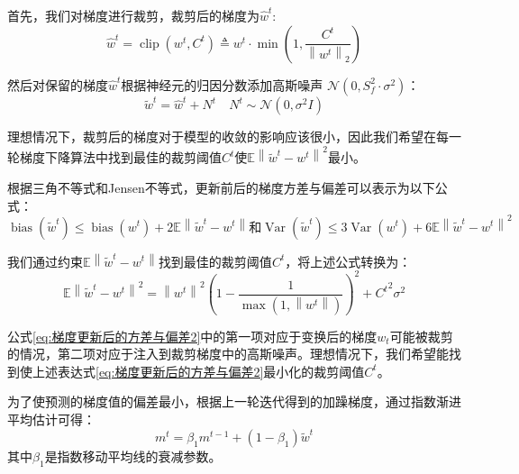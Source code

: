 首先，我们对梯度进行裁剪，裁剪后的梯度为$\hat{w}^{t}$:
\begin{equation}
\hat{w}^{t}=\operatorname{clip}\left(w^{t}, C^{t}\right) \triangleq w^{t} \cdot \min \left(1, \frac{C^{t}}{\left\|w^{t}\right\|_{2}}\right)
\end{equation}

然后对保留的梯度$\hat{w}^{t}$根据神经元的归因分数添加高斯噪声 $\mathcal{N}\left(0, S_{f}^{2} \cdot \sigma^{2}\right)$：
\begin{equation}
\tilde{w}^{t}=\hat{w}^{t}+N^{t} \quad N^{t} \sim \mathcal{N}\left(0, \sigma^{2} I\right)
\end{equation}

理想情况下，裁剪后的梯度对于模型的收敛的影响应该很小，因此我们希望在每一轮梯度下降算法中找到最佳的裁剪阈值$C^{t}$使$\mathbb{E}\left\|\tilde{w}^{t}-w^{t}\right\|^{2}$最小。 

根据三角不等式和Jensen不等式，更新前后的梯度方差与偏差可以表示为以下公式：
\begin{equation}\label{eq:梯度更新后的方差与偏差}
\operatorname{bias}\left(\tilde{w}^{t}\right) \leq \operatorname{bias}\left(w^{t}\right)+2 \mathbb{E}\left\|\tilde{w}^{t}-w^{t}\right\| \text {和} \operatorname{Var}\left(\tilde{w}^{t}\right) \leq 3 \operatorname{Var}\left(w^{t}\right)+6 \mathbb{E}\left\|\tilde{w}^{t}-w^{t}\right\|^{2}
\end{equation}

我们通过约束$\mathbb{E}\left\|\tilde{w}^{t}-w^{t}\right\|$找到最佳的裁剪阈值$C^{t}$，将上述公式转换为：
\begin{equation}\label{eq:梯度更新后的方差与偏差2}
\mathbb{E}\left\|\tilde{w}^{t}-w^{t}\right\|^{2}=\left\|w^{t}\right\|^{2}\left(1-\frac{1}{\max \left(1,\left\|w^{t}\right\|\right)}\right)^{2}+{C^{t}}^{2} \sigma^{2}
\end{equation}

公式\ref{eq:梯度更新后的方差与偏差2}中的第一项对应于变换后的梯度$w_{t}$可能被裁剪的情况，第二项对应于注入到裁剪梯度中的高斯噪声。理想情况下，我们希望能找到使上述表达式\ref{eq:梯度更新后的方差与偏差2}最小化的裁剪阈值$C^{t}$。

为了使预测的梯度值的偏差最小，根据上一轮迭代得到的加躁梯度，通过指数渐进平均估计可得：
\begin{equation}\label{eq:梯度偏差估计}
m^{t}=\beta_{1} m^{t-1}+\left(1-\beta_{1}\right) \tilde{w}^{t}
\end{equation}
其中$\beta_{1}$是指数移动平均线的衰减参数。

